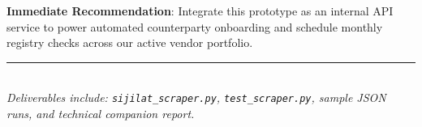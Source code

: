 \documentclass[11pt,a4paper]{article}
\begin{document}
\textbf{Immediate Recommendation}: Integrate this prototype as an internal API service to power automated counterparty onboarding and schedule monthly registry checks across our active vendor portfolio.

\vspace{1.0em}
\noindent\rule{\textwidth}{0.5pt}\\
\emph{Deliverables include: \texttt{sijilat\_scraper.py}, \texttt{test\_scraper.py}, sample JSON runs, and technical companion report.}
\end{document}
